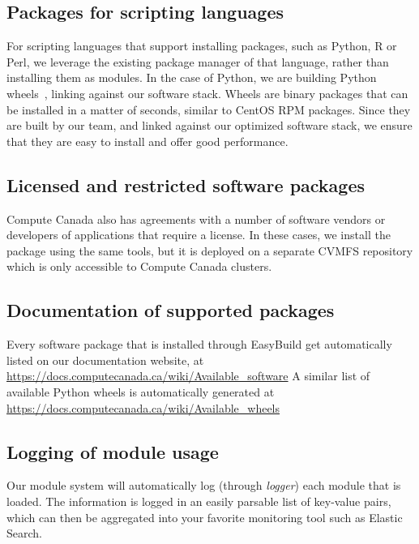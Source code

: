 \documentclass[sigconf]{acmart}
\begin{document}
\subsection{Packages for scripting languages}
\label{sub:Packages_for_scripting_languages}
For scripting languages that support installing packages, such as Python, R or Perl, we leverage the existing package manager of that language, rather than installing them as modules. In the case of Python, we are building Python wheels~\cite{Wheels}, linking against our software stack. Wheels are binary packages that can be installed in a matter of seconds, similar to CentOS RPM packages. Since they are built by our team, and linked against our optimized software stack, we ensure that they are easy to install and offer good performance.

\subsection{Licensed and restricted software packages}
\label{sub:Licensed_software_packages}
Compute Canada also has agreements with a number of software vendors or developers of applications that require a license. In these cases, we install the package using the same tools, but it is deployed on a separate CVMFS repository which is only accessible to Compute Canada clusters.

\subsection{Documentation of supported packages}
\label{sub:Documentation}
Every software package that is installed through EasyBuild get automatically listed on our documentation website, at \\
\url{https://docs.computecanada.ca/wiki/Available_software}
A similar list of available Python wheels is automatically generated at \\
\url{https://docs.computecanada.ca/wiki/Available_wheels}


\subsection{Logging of module usage}
\label{sub:Logging}
Our module system will automatically log (through {\it logger}) each module that is loaded. The information is logged in an easily parsable list of key-value pairs, which can then be aggregated into your favorite monitoring tool such as Elastic Search. 
\end{document}
